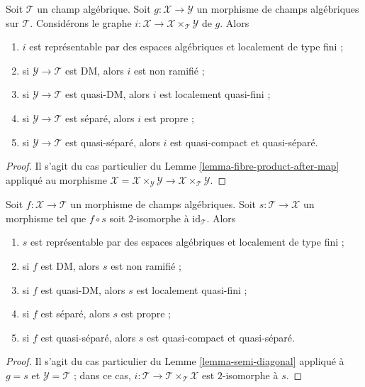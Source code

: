 \begin{lemma}
\label{lemma-semi-diagonal}
Soit $\mathcal{T}$ un champ algébrique. Soit
$g : \mathcal{X} \to \mathcal{Y}$ un morphisme de champs algébriques sur
$\mathcal{T}$. Considérons le graphe
$i : \mathcal{X} \to \mathcal{X} \times_\mathcal{T} \mathcal{Y}$ de $g$. Alors
\begin{enumerate}
\item $i$ est représentable par des espaces algébriques et localement de type
fini ;
\item si $\mathcal{Y} \to \mathcal{T}$ est DM, alors $i$ est non ramifié ;
\item si $\mathcal{Y} \to \mathcal{T}$ est quasi-DM, alors $i$ est localement
quasi-fini ;
\item si $\mathcal{Y} \to \mathcal{T}$ est séparé, alors $i$ est propre ;
\item si $\mathcal{Y} \to \mathcal{T}$ est quasi-séparé, alors $i$ est
quasi-compact et quasi-séparé.
\end{enumerate}
\end{lemma}

\begin{proof}
Il s'agit du cas particulier du Lemme \ref{lemma-fibre-product-after-map}
appliqué au morphisme
$\mathcal{X} = \mathcal{X} \times_\mathcal{Y} \mathcal{Y} \to
\mathcal{X} \times_\mathcal{T} \mathcal{Y}$.
\end{proof}

\begin{lemma}
\label{lemma-section-immersion}
Soit $f : \mathcal{X} \to \mathcal{T}$ un morphisme de champs algébriques.
Soit $s : \mathcal{T} \to \mathcal{X}$ un morphisme tel que
$f \circ s$ soit $2$-isomorphe à $\text{id}_\mathcal{T}$. Alors
\begin{enumerate}
\item $s$ est représentable par des espaces algébriques et localement de type
fini ;
\item si $f$ est DM, alors $s$ est non ramifié ;
\item si $f$ est quasi-DM, alors $s$ est localement quasi-fini ;
\item si $f$ est séparé, alors $s$ est propre ;
\item si $f$ est quasi-séparé, alors $s$ est quasi-compact et quasi-séparé.
\end{enumerate}
\end{lemma}

\begin{proof}
Il s'agit du cas particulier du Lemme \ref{lemma-semi-diagonal} appliqué à
$g = s$ et $\mathcal{Y} = \mathcal{T}$ ; dans ce cas,
$i : \mathcal{T} \to \mathcal{T} \times_\mathcal{T} \mathcal{X}$
est $2$-isomorphe à $s$.
\end{proof}

